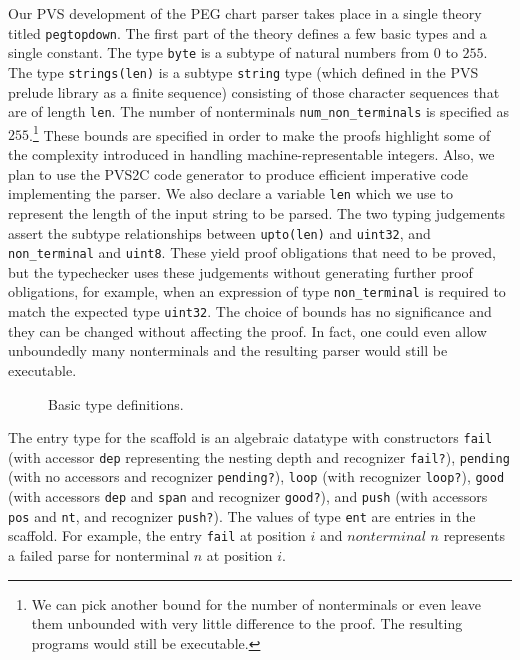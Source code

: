 \documentclass[sigplan,10pt,anonymous,review]{acmart}\settopmatter{printfolios=true,printccs=false,printacmref=false}
\begin{document}
\begin{CCSXML}
Our PVS development of the PEG chart parser takes place in a single theory
titled \texttt{pegtopdown}.
The first part of the theory defines a few basic types and a single
constant.  The type \texttt{byte} is a subtype of natural numbers from
$0$ to $255$\@.  The type \texttt{strings(len)} is a subtype
\texttt{string} type (which defined in the PVS prelude library as a
finite sequence) consisting of those character sequences that are of
length \texttt{len}\@.  The number of nonterminals
\texttt{num\_non\_terminals} is specified as $255$\@.\footnote{We can pick another
  bound for the number of nonterminals or even leave them unbounded with
  very little difference to the proof.  The resulting programs
  would still be executable.}  These bounds are specified in order to
make the proofs highlight some of the complexity introduced in
handling machine-representable integers. Also, we plan to use
the PVS2C code generator to produce efficient imperative code implementing
the parser.  We also declare a variable \texttt{len} which we use to represent the length
of the input string to be parsed.  The two typing judgements assert the
subtype relationships between \texttt{upto(len)} and \texttt{uint32},
and \texttt{non\_terminal} and \texttt{uint8}\@.  These yield proof
obligations that need to be proved, but the typechecker uses these
judgements without generating further proof obligations, for example,
when an expression of type \texttt{non\_terminal} is required to match
the expected type \texttt{uint32}\@.  The choice of bounds has no 
significance and they can be changed without affecting the proof.
In fact, one could even allow unboundedly many nonterminals and the resulting
parser would still be executable.  
\begin{figure}[h!]
  {}
  \vspace*{-4mm}
			\caption{Basic type definitions.}
			\label{pvs:byte}
\end{figure}

The entry type for the scaffold is an algebraic datatype with
constructors \texttt{fail} (with accessor \texttt{dep} representing
the nesting depth and recognizer \texttt{fail?}), \texttt{pending}
(with no accessors and recognizer \texttt{pending?}), \texttt{loop}
(with recognizer \texttt{loop?}), \texttt{good} (with accessors
\texttt{dep} and \texttt{span} and recognizer \texttt{good?}), and
\texttt{push} (with accessors \texttt{pos} and \texttt{nt}, and
recognizer \texttt{push?}).  The values of type \texttt{ent} are
entries in the scaffold.  For example, the entry \texttt{fail} at
position $i$ and $nonterminal$ $n$ represents a failed parse for
nonterminal $n$ at position $i$.


\end{CCSXML}
\end{document}
